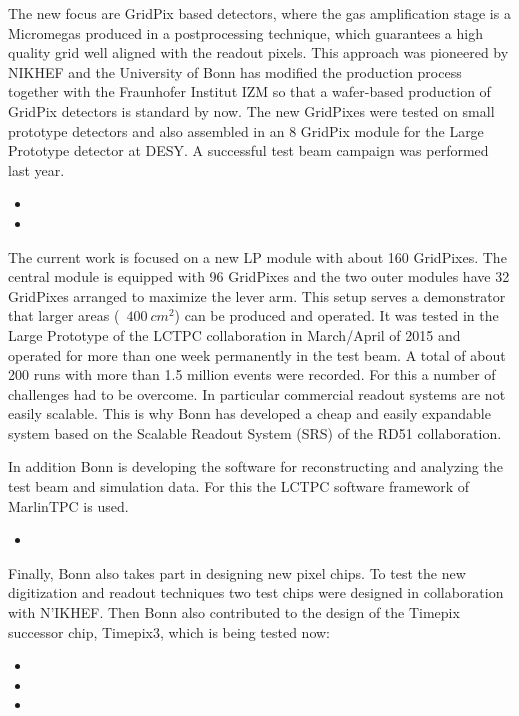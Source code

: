 The new focus are GridPix based detectors, where the gas amplification stage is a Micromegas produced in a postprocessing technique, which guarantees a high quality grid well aligned with the readout pixels. This approach was pioneered by NIKHEF and the University of Bonn has modified the production process together with the Fraunhofer Institut IZM so that a wafer-based production of GridPix detectors is standard by now. The new GridPixes were tested on small prototype detectors and also assembled in an 8 GridPix module for the Large Prototype detector at DESY. A successful test beam campaign was performed last year.
\begin{itemize}
\item {}
\item {}
\end{itemize}
The current work is focused on a new LP module with about 160 GridPixes. The central module is equipped with 96 GridPixes and the two outer modules have 32 GridPixes arranged to maximize the lever arm. This setup serves a demonstrator that larger areas (~$\SI{400}{cm^2}$) can be produced and operated. It was tested in the Large Prototype of the LCTPC collaboration in March/April of 2015 and operated for more than one week permanently in the test beam. A total of about 200 runs with more than 1.5 million events were recorded.
For this a number of challenges had to be overcome. In particular commercial readout systems are not easily scalable. This is why Bonn has developed a cheap and easily expandable system based on the Scalable Readout System (SRS) of the RD51 collaboration.

In addition Bonn is developing the software for reconstructing and analyzing the test beam and simulation data. For this the LCTPC software framework of MarlinTPC is used.
\begin{itemize}
\item {}
\end{itemize}

Finally, Bonn also takes part in designing new pixel chips. To test the new digitization and readout techniques two test chips were designed in collaboration with N'IKHEF. Then Bonn also contributed to the design of the Timepix successor chip, Timepix3, which is being tested now:
\begin{itemize}
\item {}
\item {}
\item {}
\end{itemize}

